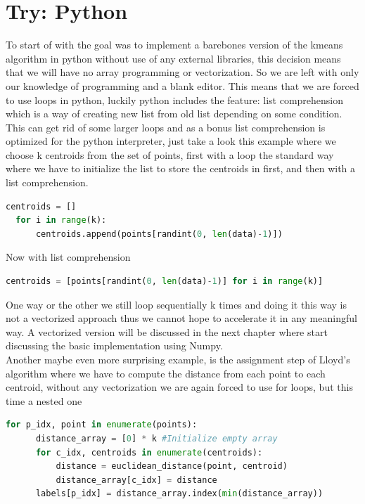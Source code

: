 \documentclass[12pt]{report}
\begin{document}
\section{Try: Python}
\label{subsec:beginning}
To start of with the goal was to implement a barebones version of the kmeans algorithm in python without use of any external libraries, this decision means that we will have no array programming or vectorization. So we are left with only our knowledge of programming and a blank editor.
This means that we are forced to use loops in python, luckily python includes the feature: list comprehension which is a way of creating new list from  old list depending on some condition. This can get rid of some larger loops and as a bonus list comprehension is optimized for the python interpreter, just take a look this example where we choose k centroids from the set of points, first with a loop the standard way where we have to initialize the list to store the centroids in first, and then with a list comprehension.

\begin{lstlisting}[language=Python]
  centroids = []
  for i in range(k):
      centroids.append(points[randint(0, len(data)-1)])
\end{lstlisting}
Now with list comprehension
\begin{lstlisting}[language=Python]
centroids = [points[randint(0, len(data)-1)] for i in range(k)]
\end{lstlisting}
One way or the other we still loop sequentially k times and doing it this way is not a vectorized approach thus we cannot hope to accelerate it in any meaningful way. A vectorized version will be discussed in the next chapter where start discussing the basic implementation using Numpy. \\
Another maybe even more surprising example, is the assignment step of Lloyd's algorithm where we have to compute the distance from each point to each centroid, without any vectorization we are again forced to use for loops, but this time a nested one

\begin{lstlisting}[language=Python]
  for p_idx, point in enumerate(points):
      distance_array = [0] * k #Initialize empty array
      for c_idx, centroids in enumerate(centroids):
          distance = euclidean_distance(point, centroid)
          distance_array[c_idx] = distance
      labels[p_idx] = distance_array.index(min(distance_array))
\end{lstlisting}
\end{document}
